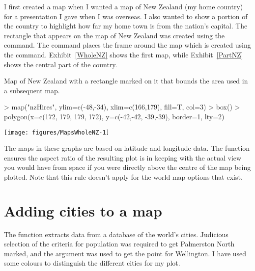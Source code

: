 I first created a map when I wanted a map of New Zealand (my home country) for a presentation I gave when I was overseas. I also wanted to show a portion of the country to highlight how far my home town is from the nation's capital. The rectangle that appears on the map of New Zealand was created using the  command. The  command places the frame around the map which is created using the  command. Exhibit~\ref{WholeNZ} shows the first map, while Exhibit~\ref{PartNZ} shows the central part of the country. 
\begin{exhibit} 
\caption{Map of New Zealand with a rectangle marked on it that bounds the area used in a subsequent map.} 
\label{WholeNZ} 
\begin{center} 

\begin{Schunk}
\begin{Sinput}
> map("nzHires", ylim=c(-48,-34), xlim=c(166,179), fill=T, col=3) 
> box() 
> polygon(x=c(172, 179, 179, 172), y=c(-42,-42, -39,-39), border=1, lty=2) 
\end{Sinput}

\texttt{[image: figures/MapsWholeNZ-1]} \end{Schunk}

\end{center} 
\end{exhibit} 
 
The maps in these graphs are based on latitude and longitude data. The  function ensures the aspect ratio of the resulting plot is in keeping with the actual view you would have from space if you were directly above the centre of the map being plotted. Note that this rule doesn't apply for the world map options that exist. 
 
\section{Adding cities to a map} 
 
The  function extracts data from a database of the world's cities. Judicious selection of the criteria for population was required to get Palmerston North marked, and the  argument was used to get the point for Wellington. I have used some colours to distinguish the different cities for my plot. 
 
